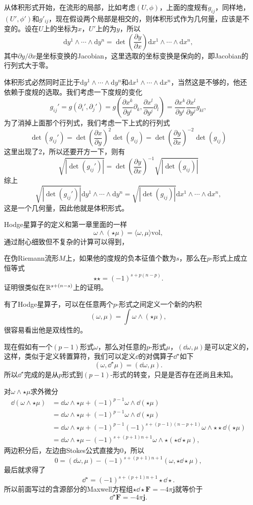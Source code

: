 从体积形式开始，在流形的局部，比如考虑$(U,\phi)$，上面的度规有$g_{ij}$，同样地，$(U',\phi')$和$g'_{ij}$，现在假设两个局部是相交的，则体积形式作为几何量，应该是不变的。设在$U$上的坐标为$x$，$U'$上的为$y$，所以
\[
	\mathrm{d}y^1\wedge \cdots \wedge\mathrm{d}y^n=\det\left(\frac{\partial y}{\partial x}\right)\mathrm{d}x^1\wedge \cdots \wedge \mathrm{d}x^n,
\]
其中$\partial y/\partial x$是坐标变换的Jacobian，这里选取的坐标变换是保向的，即Jacobian的行列式大于零。

体积形式必然同时正比于$\mathrm{d}y^1\wedge \cdots \wedge \mathrm{d}y^n$和$\mathrm{d}x^1\wedge \cdots \wedge \mathrm{d}x^n$，当然这是不够的，他还依赖于度规的选取。我们考虑一下度规的变化
\[
	g_{ij}'=g(\partial_i',\partial_j')=g\left(\frac{\partial x^k}{\partial y^i}\partial_k,\frac{\partial x^l}{\partial y^j}\partial_l\right)=\frac{\partial x^k}{\partial y^i}\frac{\partial x^l}{\partial y^j}g_{kl},
\]
为了消掉上面那个行列式，我们考虑一下上式的行列式
\[
	\det(g_{ij}')=\det\left(\frac{\partial x}{\partial y}\right)^2\det(g_{ij})=\det\left(\frac{\partial y}{\partial x}\right)^{-2}\det(g_{ij})
\]
这里出现了2，所以还要开方一下，则有
\[
	\sqrt{|\det(g_{ij}')|}=\det\left(\frac{\partial y}{\partial x}\right)^{-1}\sqrt{|\det(g_{ij})|}
\]
综上
\[
	\sqrt{|\det(g_{ij}')|}\mathrm{d}y^1\wedge \cdots \wedge \mathrm{d}y^n=\sqrt{|\det(g_{ij})|}\mathrm{d}x^1\wedge \cdots \wedge \mathrm{d}x^n,
\]
这是一个几何量，因此他就是体积形式。

Hodge星算子的定义和第一章里面的一样
\[
	\omega\wedge(\star \mu)=\langle \omega,\mu\rangle \mathrm{vol},
\]
通过耐心细致但不复杂的计算可以得到，

\pro 在伪Riemann流形$M$上，如果他的度规的负本征值个数为$s$，那么在$p$-形式上成立恒等式
	\[\star\star=(-1)^{s+p(n-p)}.\]
证明很类似在$\mathbb{R}^{s+(n-s)}$上的证明。

有了Hodge星算子，可以在任意两个$p$-形式之间定义一个新的内积
\[
	(\omega,\mu)=\int \omega\wedge(\star \mu),
\]
很容易看出他是双线性的。

现在假如有一个$(p-1)$形式$\omega$，那么对任意的$p$-形式$\mu$，$(\dd \omega,\mu)$是可以定义的，这样，类似于定义转置算符，我们可以定义$\dd$的对偶算子$\dd^\star$如下
\[
	(\omega,\dd^\star\mu)=(\dd \omega,\mu).
\]
所以$\dd^\star$完成的是从$p$形式到$(p-1)$-形式的转变，只是是否存在还尚且未知。

对$\omega\wedge\star\mu$求外微分
\begin{align*}
	\dd (\omega\wedge\star\mu)&=\dd \omega\wedge\star\mu+(-1)^{p-1}\omega\wedge\dd(\star\mu)\\
	&=\dd \omega\wedge\star\mu+(-1)^{p-1}\omega\wedge\dd(\star\mu)\\
	&=\dd \omega\wedge\star\mu+(-1)^{p-1}(-1)^{s+(p-1)(n-p+1)}\omega\wedge\star\star\dd(\star\mu)\\
	&=\dd \omega\wedge\star\mu-(-1)^{s+(p+1)n+1}\omega\wedge\star(\star\dd\star\mu),
\end{align*}
两边积分后，左边由Stokes公式直接为0，所以
\[
	0=(\dd \omega,\mu)-(-1)^{s+(p+1)n+1}(\omega,\star\dd\star\mu),
\]
最后就求得了
\[
	\dd^\star=(-1)^{s+(p+1)n+1}\star\dd\star.
\]
所以前面写过的含源部分的Maxwell方程组$\star\dd \star \mathbf{F}=-4\pi\mathbf{j}$就等价于
\[
	\dd^\star \mathbf{F}=-4\pi\mathbf{j}.
\]

